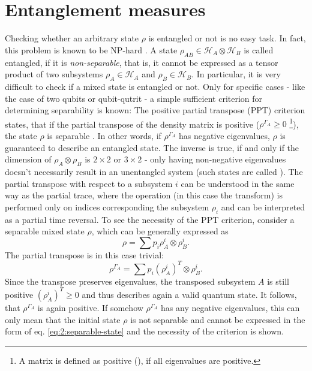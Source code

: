 \section{Entanglement measures}
Checking whether an arbitrary state $\rho$ is entangled or not is no easy task. In fact, this problem is known to be NP-hard \cite{Gurvits_2003}.
A state $\rho_{AB} \in \mathcal{H}_A\otimes\mathcal{H}_B$ is called entangled, if it is \emph{non-separable}, that is, it cannot be expressed as a tensor product of two subsystems $\rho_A \in \mathcal{H}_A$ and $\rho_B \in \mathcal{H}_B$.
In particular, it is very difficult to check if a mixed state is entangled or not. Only for specific cases - like the case of two qubits or qubit-qutrit - a simple sufficient criterion for determining separability is known:
The positive partial transpose (PPT) criterion states, that if the partial transpose of the density matrix is positive ($\rho^{\Gamma_A} \geq 0$ \footnote{A matrix is defined as positive (), if all eigenvalues are positive.}), the state $\rho$ is separable \cite{Horodecki_2009,Plenio_2005a}. In other words, if $\rho^{\Gamma_A}$ has negative eigenvalues, $\rho$ is guaranteed to describe an entangled state.
The inverse is true, if and only if the dimension of $\rho_A\otimes\rho_B$ is $2\times2$ or $3\times2$ \cite{Horodecki_2009} - only having non-negative eigenvalues doesn't necessarily result in an unentangled system (such states are called ).
The partial transpose with respect to a subsystem $i$ can be understood in the same way as the partial trace, where the operation (in this case the transform) is performed only on indices corresponding the subsystem $\rho_i$ and can be interpreted as a partial time reversal.
To see the necessity of the PPT criterion, consider a separable mixed state $\rho$, which can be generally expressed as 
\begin{equation}\label{eq:2:separable-state}
  \rho = \sum p_i \rho_{A}^i\otimes\rho_{B}^i .
\end{equation}
The partial transpose is in this case trivial:
\begin{equation}
  \rho^{\Gamma_A} = \sum p_i (\rho_{A}^i)^T \otimes \rho_{B}^i .
\end{equation}
Since the transpose preserves eigenvalues, the transposed subsystem $A$ is still positive $(\rho_{A}^i)^T \geq 0$ and thus describes again a valid quantum state. It follows, that $\rho^{\Gamma_A}$ is again positive.
If somehow $\rho^{\Gamma_A}$ has any negative eigenvalues, this can only mean that the initial state $\rho$ is not separable and cannot be expressed in the form of eq. \eqref{eq:2:separable-state} and the necessity of the criterion is shown.


